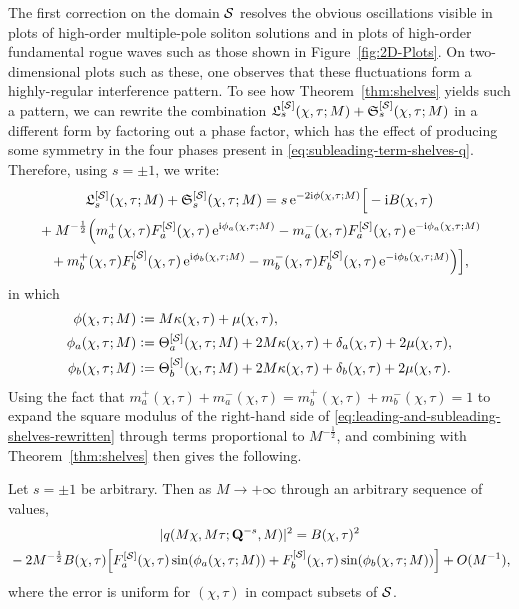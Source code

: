 The first correction on the domain $\mathcal{S}$ resolves the obvious oscillations visible in plots of high-order multiple-pole soliton solutions \cite{BilmanBW19} and in plots of high-order fundamental rogue waves such as those shown in Figure~\ref{fig:2D-Plots}.  On two-dimensional plots such as these, one observes that these fluctuations form a highly-regular interference pattern.  To see how Theorem~\ref{thm:shelves} yields such a pattern, we can rewrite the combination $\mathfrak{L}_s^{[\mathcal{S}]}(\chi,\tau;M)+\mathfrak{S}_s^{[\mathcal{S}]}(\chi,\tau;M)$ in a different form by factoring out a phase factor, which has the effect of producing some symmetry in the four phases present in \eqref{eq:subleading-term-shelves-q}.  Therefore, using $s=\pm 1$, we write:
\begin{multline}
\mathfrak{L}_s^{[\mathcal{S}]}(\chi,\tau;M)+\mathfrak{S}_s^{[\mathcal{S}]}(\chi,\tau;M) = s\,\mathrm{e}^{-2\mathrm{i}\phi(\chi,\tau;M)}\Big[-\mathrm{i} B(\chi,\tau)\\
{}+M^{-\frac{1}{2}}\Big(m_a^+(\chi,\tau)F_a^{[\mathcal{S}]}(\chi,\tau)\,\mathrm{e}^{\mathrm{i}\phi_a(\chi,\tau;M)} -
m_a^-(\chi,\tau)F_a^{[\mathcal{S}]}(\chi,\tau)\,\mathrm{e}^{-\mathrm{i}\phi_a(\chi,\tau;M)} \\
{}+
m_b^+(\chi,\tau)F_b^{[\mathcal{S}]}(\chi,\tau)\,\mathrm{e}^{\mathrm{i}\phi_b(\chi,\tau;M)} -
m_b^-(\chi,\tau)F_b^{[\mathcal{S}]}(\chi,\tau)\,\mathrm{e}^{-\mathrm{i}\phi_b(\chi,\tau;M)}\Big)
\Big],
\label{eq:leading-and-subleading-shelves-rewritten}
\end{multline}
in which
\begin{equation}
\begin{split}
\phi(\chi,\tau;M)&\vcentcolon= M\kappa(\chi,\tau)+\mu(\chi,\tau),\\
\phi_a(\chi,\tau;M)&\vcentcolon= \Theta^{[\mathcal{S}]}_a(\chi,\tau;M)+2M\kappa(\chi,\tau) + \delta_a(\chi,\tau) + 2\mu(\chi,\tau),\\
\phi_b(\chi,\tau;M)&\vcentcolon= \Theta^{[\mathcal{S}]}_b(\chi,\tau;M)+2M\kappa(\chi,\tau) + \delta_b(\chi,\tau) + 2\mu(\chi,\tau).
\end{split}
\label{eq:symmetrical-phases}
\end{equation}
Using the fact that $m_a^+(\chi,\tau)+m_a^-(\chi,\tau)=m_b^+(\chi,\tau)+m_b^-(\chi,\tau)=1$ to expand the square modulus of the right-hand side of \eqref{eq:leading-and-subleading-shelves-rewritten} through terms proportional to $M^{-\frac{1}{2}}$, and combining with Theorem~\ref{thm:shelves} then gives the following.
\begin{corollary}
Let $s=\pm 1$ be arbitrary.  Then as $M\to+\infty$ through an arbitrary sequence of values, 
\begin{multline}
|q(M\chi,M\tau;\mathbf{Q}^{-s},M)|^2 = 
B(\chi,\tau)^2\\
{}-2M^{-\frac{1}{2}}B(\chi,\tau)\left[F_a^{[\shelves]}(\chi,\tau)\sin(\phi_a(\chi,\tau;M))+F_b^{[\shelves]}(\chi,\tau)\sin(\phi_b(\chi,\tau;M))\right]+O(M^{-1}),
\label{eq:interference}
\end{multline}
where the error is uniform for $(\chi,\tau)$ in compact subsets of $\mathcal{S}$.
\label{cor:pattern}
\end{corollary}
